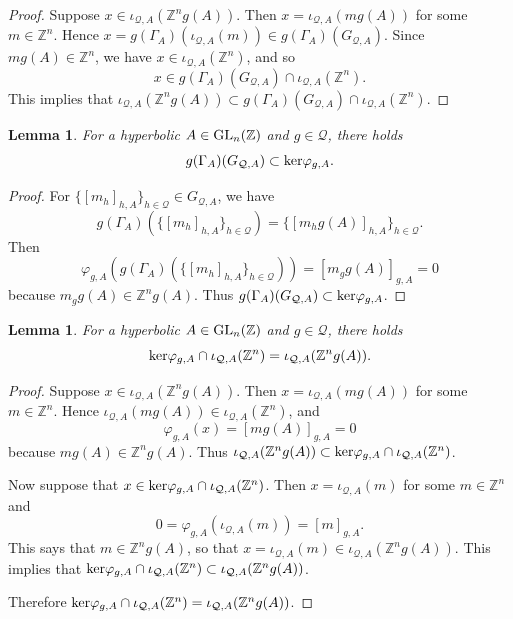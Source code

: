 \documentclass{amsart}
\theoremstyle{plain}
\newtheorem{lemma}[theorem]{Lemma}
\theoremstyle{definition}
\theoremstyle{remark}
\begin{document}
\begin{proof} Suppose $x \in \iota_{ {\mathcal Q},A}( {\mathbb Z}^n g(A))$. Then $x=\iota_{ {\mathcal Q},A}(m g(A))$ for some $m\in{\mathbb Z}^n$. Hence $x = g(\Gamma_A)(\iota_{ {\mathcal Q},A}(m)) \in g(\Gamma_A)(G_{ {\mathcal Q},A})$. Since $mg(A)\in{\mathbb Z}^n$, we have $x \in \iota_{ {\mathcal Q},A}({\mathbb Z}^n)$, and so
\[ x \in g(\Gamma_A)(G_{ {\mathcal Q},A}) \cap \iota_{ {\mathcal Q},A}({\mathbb Z}^n).\]
This implies that $\iota_{ {\mathcal Q},A}({\mathbb Z}^n g(A) )\subset g(\Gamma_A)(G_{ {\mathcal Q},A}) \cap \iota_{ {\mathcal Q},A}({\mathbb Z}^n)$.
\end{proof}

\begin{lemma}\label{contains} For a hyperbolic $A\in {\rm GL}_n({\mathbb Z})$ and $g\in{\mathcal Q}$, there holds
\[ g(\Gamma_A)(G_{ {\mathcal Q},A}) \subset  {\rm ker}\varphi_{g,A}.\] 
\end{lemma}

\begin{proof} For $\{ [m_h]_{h,A}\}_{h\in{\mathcal Q}}\in G_{ {\mathcal Q},A}$, we have
\[ g(\Gamma_A)(\{ [m_h]_{h,A}\}_{h\in{\mathcal Q}}) = \{ [m_h g(A)]_{h,A}\}_{h\in{\mathcal Q}}.\]
Then
\[ \varphi_{g,A}( g(\Gamma_A) (\{ [m_h]_{h,A}\}_{h\in{\mathcal Q}})) = [m_g g(A)]_{g,A} = 0\]
because $m_g g(A)\in {\mathbb Z}^n g(A)$. Thus $g(\Gamma_A)(G_{ {\mathcal Q},A})  \subset  {\rm ker}\varphi_{g,A}$.
\end{proof}

\begin{lemma}\label{kernel} For a hyperbolic $A\in {\rm GL}_n({\mathbb Z})$ and $g\in{\mathcal Q}$, there holds
\[ {\rm ker}\varphi_{g,A} \cap \iota_{ {\mathcal Q},A}({\mathbb Z}^n) = \iota_{ {\mathcal Q},A}( {\mathbb Z}^n g(A)).\]
\end{lemma}

\begin{proof} Suppose $x\in \iota_{ {\mathcal Q},A}({\mathbb Z}^n g(A))$. Then $x=\iota_{ {\mathcal Q},A}(m g(A))$ for some $m\in{\mathbb Z}^n$. Hence $\iota_{ {\mathcal Q},A}(m g(A))\in \iota_{ {\mathcal Q},A}({\mathbb Z}^n)$, and 
\[ \varphi_{g,A} (x) = [mg(A)]_{g,A} = 0\]
because $m g(A)\in {\mathbb Z}^n g(A)$. Thus $\iota_{ {\mathcal Q},A}({\mathbb Z}^n g(A))\subset {\rm ker}\varphi_{g,A}\cap \iota_{ {\mathcal Q},A}({\mathbb Z}^n)$.

Now suppose that $x \in {\rm ker}\varphi_{g,A} \cap \iota_{ {\mathcal Q},A}({\mathbb Z}^n)$. Then $x=\iota_{ {\mathcal Q},A}(m)$ for some $m\in{\mathbb Z}^n$ and
\[ 0 = \varphi_{g,A} (\iota_{ {\mathcal Q},A}(m)) =  [m]_{g,A}.\]
This says that $m\in {\mathbb Z}^n g(A)$, so that $x = \iota_{ {\mathcal Q},A}(m) \in \iota_{ {\mathcal Q},A}({\mathbb Z}^n g(A))$. This implies that ${\rm ker}\varphi_{g,A}\cap \iota_{ {\mathcal Q},A}({\mathbb Z}^n) \subset \iota_{ {\mathcal Q},A}({\mathbb Z}^n g(A))$.

Therefore ${\rm ker}\varphi_{g,A} \cap \iota_{ {\mathcal Q},A}({\mathbb Z}^n) = \iota_{ {\mathcal Q},A}( {\mathbb Z}^n g(A))$.
\end{proof}
\end{document}

